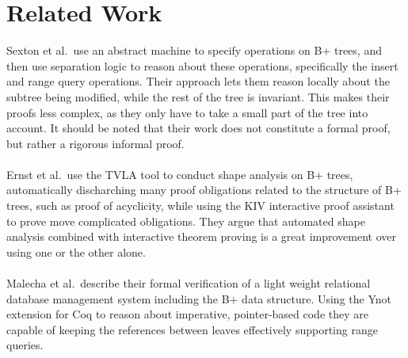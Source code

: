 \section{Related Work}
\label{sec:RelatedWork}
Sexton et al.\,\cite{sexton2008reasoning} use an abstract machine to specify operations on B+ trees, and then use separation logic to reason about these operations, specifically the insert and range query operations. Their approach lets them reason locally about the subtree being modified, while the rest of the tree is invariant. This makes their proofs less complex, as they only have to take a small part of the tree into account. It should be noted that their work does not constitute a formal proof, but rather a rigorous informal proof.

\paragraph{}
Ernst et al.\,\cite{ernst2011verification} use the TVLA tool to conduct shape analysis on B+ trees, automatically discharching many proof obligations related to the structure of B+ trees, such as proof of acyclicity, while using the KIV interactive proof assistant to prove move complicated obligations. They argue that automated shape analysis combined with interactive theorem proving is a great improvement over using one or the other alone.

\paragraph{}
Malecha et al.\,\cite{malecha2010toward} describe their formal verification of a light weight relational database management system including the B+ data structure. Using the Ynot extension for Coq to reason about imperative, pointer-based code they are capable of keeping the references between leaves effectively supporting range queries.
